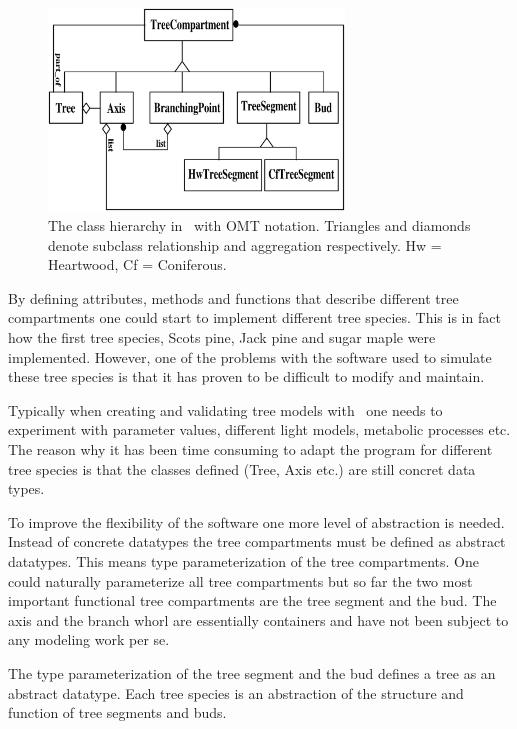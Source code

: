 \begin{figure}[h]
\begin{center}
\includegraphics[width=0.7\textwidth,height=0.5\textwidth]{lignum-classes.eps}
\caption{\label{fig:omt} The class hierarchy in \lignum\ with OMT
notation. Triangles and diamonds denote subclass relationship and 
aggregation respectively. Hw = Heartwood, Cf = Coniferous.}
\end{center}
\end{figure}

By defining attributes,  methods and functions that describe different
tree compartments  one    could start  to  implement  different   tree
species. This is in fact how the first  tree species, Scots pine, Jack
pine and  sugar maple were implemented.  However,  one of the problems
with the software  used to simulate these  tree species is that it has
proven to  be  difficult  to   modify  and maintain.   

Typically when creating  and validating tree  models with \lignum\ one
needs to   experiment with parameter  values,  different light models,
metabolic processes etc. The reason why it  has been time consuming to
adapt the program  for  different tree   species is  that  the classes
defined (Tree, Axis etc.)  are still concret data types.

To  improve  the  flexibility  of   the software  one   more level  of
abstraction  is  needed.   Instead of  concrete    datatypes the  tree
compartments must be defined  as  abstract datatypes. This  means type
parameterization of  the    tree compartments.  One  could   naturally
parameterize all tree  compartments but so far  the two most important
functional tree  compartments are the tree segment   and the bud.  The
axis and the branch whorl are essentially containers and have not been
subject to any modeling work per se.

The type  parameterization of the tree  segment and the bud  defines a
tree as an abstract datatype.  Each tree  species is an abstraction of
the structure and  function of tree segments  and buds.  

